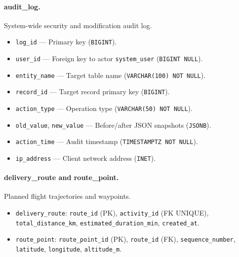 \paragraph{audit\_log.}
System-wide security and modification audit log.
\begin{itemize}
    \item \texttt{log\_id} — Primary key (\texttt{BIGINT}).
    \item \texttt{user\_id} — Foreign key to actor \texttt{system\_user} (\texttt{BIGINT NULL}).
    \item \texttt{entity\_name} — Target table name (\texttt{VARCHAR(100) NOT NULL}).
    \item \texttt{record\_id} — Target record primary key (\texttt{BIGINT}).
    \item \texttt{action\_type} — Operation type (\texttt{VARCHAR(50) NOT NULL}).
    \item \texttt{old\_value}, \texttt{new\_value} — Before/after JSON snapshots (\texttt{JSONB}).
    \item \texttt{action\_time} — Audit timestamp (\texttt{TIMESTAMPTZ NOT NULL}).
    \item \texttt{ip\_address} — Client network address (\texttt{INET}).
\end{itemize}

\paragraph{delivery\_route and route\_point.}
Planned flight trajectories and waypoints.
\begin{itemize}
    \item \texttt{delivery\_route}: \texttt{route\_id} (PK), \texttt{activity\_id} (FK UNIQUE), \texttt{total\_distance\_km}, \texttt{estimated\_duration\_min}, \texttt{created\_at}.
    \item \texttt{route\_point}: \texttt{route\_point\_id} (PK), \texttt{route\_id} (FK), \texttt{sequence\_number}, \texttt{latitude}, \texttt{longitude}, \texttt{altitude\_m}.
\end{itemize}

